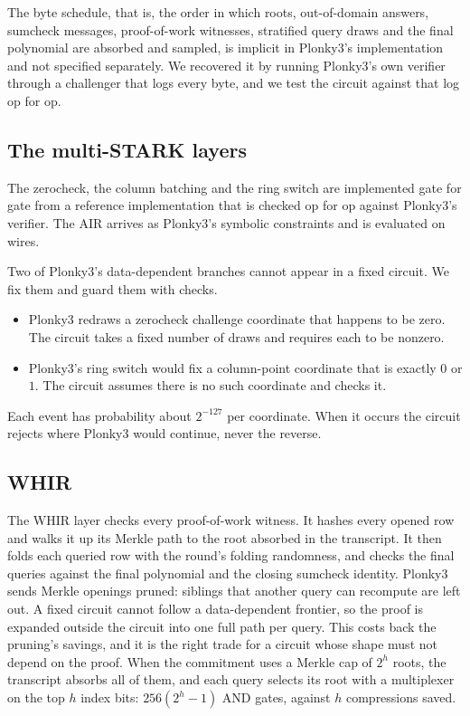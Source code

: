 \documentclass[11pt]{article}
\newcommand{\AND}{\textsf{AND}}
\begin{document}
The byte schedule, that is, the order in which roots, out-of-domain answers,
sumcheck messages, proof-of-work witnesses, stratified query draws and the final
polynomial are absorbed and sampled, is implicit in Plonky3's implementation and
not specified separately.
We recovered it by running Plonky3's own verifier through a challenger that logs
every byte, and we test the circuit against that log op for op.

\subsection{The multi-STARK layers}

The zerocheck, the column batching and the ring switch are implemented
gate for gate from a reference implementation that is checked op for op against
Plonky3's verifier. The AIR arrives as Plonky3's symbolic constraints and is
evaluated on wires.

Two of Plonky3's data-dependent branches cannot appear in a
fixed circuit. We fix them and guard them with checks.
\begin{itemize}
  \item Plonky3 redraws a zerocheck challenge coordinate that happens to be zero.
    The circuit takes a fixed number of draws and requires each to be nonzero.
  \item Plonky3's ring switch would fix a column-point coordinate that is
    exactly $0$ or $1$. The circuit assumes there is no such coordinate and
    checks it.
\end{itemize}
Each event has probability about $2^{-127}$ per coordinate. When it occurs the
circuit rejects where Plonky3 would continue, never the reverse.

\subsection{WHIR}

The WHIR layer checks every proof-of-work witness. It hashes every opened row and
walks it up its Merkle path to the root absorbed in the transcript. It then folds
each queried row with the round's folding randomness, and checks the final
queries against the final polynomial and the closing sumcheck identity. Plonky3 sends
Merkle openings pruned: siblings that another query can recompute are left out.
A fixed circuit cannot follow a data-dependent frontier, so the proof is expanded
outside the circuit into one full path per query. This costs back the pruning's
savings, and it is the right trade for a circuit whose shape must not depend on
the proof. When the commitment uses a Merkle cap of $2^h$ roots, the transcript
absorbs all of them, and each query selects its root with a multiplexer on the
top $h$ index bits: $256(2^h-1)$ \AND{} gates, against $h$ compressions saved.
\end{document}
